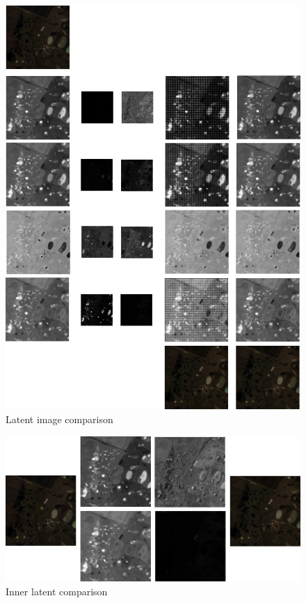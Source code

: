 \begin{figure}
\centering
\includegraphics[scale=0.6]{img/latents_2.png}
\caption{Latent image comparison}
\label{fig:latentcompare}
\end{figure}

\begin{figure}
\centering
\includegraphics[scale=0.85]{img/innerlatent.png}
\caption{Inner latent comparison}
\label{fig:innerlatent}
\end{figure}


